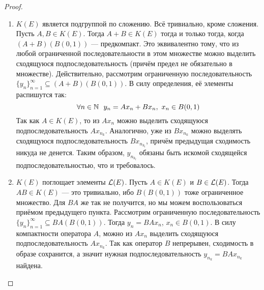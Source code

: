 \begin{proof}~
	\begin{enumerate}
		\item $K(E)$ является подгруппой по сложению. Всё тривиально, кроме сложения. Пусть $A, B \in K(E)$. Тогда $A + B \in K(E)$ тогда и только тогда, когда $(A + B)(B(0, 1))$ --- предкомпакт. Это эквивалентно тому, что из любой ограниченной последовательности в этом множестве можно выделить сходящуюся подпоследовательность (причём предел не обязательно в множестве). Действительно, рассмотрим ограниченную последовательность $\{y_n\}_{n = 1}^\infty \subseteq (A + B)(B(0, 1))$. В силу определения, её элементы распишутся так:
		\[
			\forall n \in \mathbb{N}\ \ y_n = Ax_n + Bx_n,\ x_n \in B(0, 1)
		\]
		Так как $A \in K(E)$, то из $Ax_n$ можно выделить сходящуюся подпоследовательность $Ax_{n_k}$. Аналогично, уже из $Bx_{n_k}$ можно выделять сходящуюся подпоследовательность $Bx_{n_{k_l}}$, причём предыдущая сходимость никуда не денется. Таким образом, $y_{n_{k_l}}$ обязаны быть искомой сходящейся подпоследовательностью, что и требовалось.
		
		\item $K(E)$ поглощает элементы $\mathcal{L}(E)$. Пусть $A \in K(E)$ и $B \in \mathcal{L}(E)$. Тогда $AB \in K(E)$ --- это тривиально, ибо $B(B(0, 1))$ тоже ограниченное множество. Для $BA$ же так не получится, но мы можем воспользоваться приёмом предыдущего пункта. Рассмотрим ограниченную последовательность $\{y_n\}_{n = 1}^\infty \subseteq BA(B(0, 1))$. Тогда $y_n = BAx_n$, $x_n \in B(0, 1)$. В силу компактности оператора $A$, можно из $Ax_n$ выделить сходящуюся подпоследовательность $Ax_{n_k}$. Так как оператор $B$ непрерывен, сходимость в образе сохранится, а значит нужная подпоследовательность $y_{n_k} = BAx_{n_k}$ найдена.
	\end{enumerate}
\end{proof}
